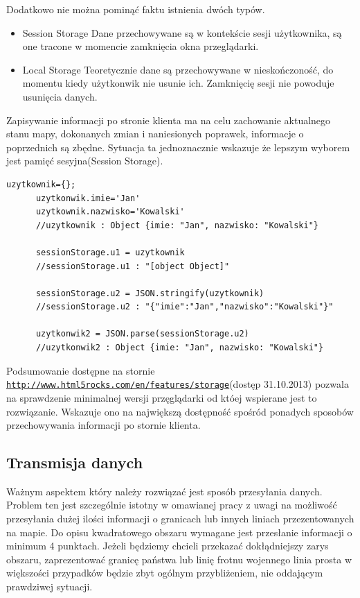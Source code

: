 Dodatkowo nie można pominąć faktu istnienia dwóch typów.
\begin{itemize}

\item
Session Storage
Dane przechowywane są w kontekście sesji użytkownika, są one tracone w momencie zamknięcia okna przeglądarki.

\item
Local Storage
Teoretycznie dane są przechowywane w nieskończoność, do momentu kiedy użytkonwik nie usunie ich. Zamknięcię sesji nie powoduje usunięcia danych.

\end{itemize}

Zapisywanie informacji po stronie klienta ma na celu zachowanie aktualnego stanu mapy, dokonanych zmian i naniesionych poprawek, informacje o poprzednich są zbędne. Sytuacja ta jednoznacznie wskazuje że lepszym wyborem jest pamięć sesyjna(Session Storage).

\lstset{language=JavaScript}
\label{lis:storage}
\begin{lstlisting}[caption=json]
      uzytkownik={};
      uzytkonwik.imie='Jan'
      uzytkownik.nazwisko='Kowalski'
      //uzytkownik : Object {imie: "Jan", nazwisko: "Kowalski"}

      sessionStorage.u1 = uzytkownik
      //sessionStorage.u1 : "[object Object]"

      sessionStorage.u2 = JSON.stringify(uzytkownik)
      //sessionStorage.u2 : "{"imie":"Jan","nazwisko":"Kowalski"}"

      uzytkonwik2 = JSON.parse(sessionStorage.u2)
      //uzytkonwik2 : Object {imie: "Jan", nazwisko: "Kowalski"}
\end{lstlisting}


Podsumowanie dostępne na stornie \underline{\texttt{http://www.html5rocks.com/en/features/storage}}(dostęp 31.10.2013) pozwala na sprawdzenie minimalnej wersji przęglądarki od któej wspierane jest to rozwiązanie. Wskazuje ono na największą dostępność spośród ponadych sposobów przechowywania informacji po stornie klienta. 

\subsection{Transmisja danych}
\label{subsec:transmisjaDanych}

Ważnym aspektem który należy rozwiązać jest sposób przesyłania danych. Problem ten jest szczególnie istotny w omawianej pracy z uwagi na możliwość przesyłania dużej ilości informacji o granicach lub innych liniach przezentowanych na mapie. Do opisu kwadratowego obszaru wymagane jest przesłanie informacji o minimum 4 punktach. Jeżeli będziemy chcieli przekazać dokłądniejszy zarys obszaru, zaprezentować granicę państwa lub linię frotnu wojennego linia prosta w większości przypadków będzie zbyt ogólnym przybliżeniem, nie oddającym prawdziwej sytuacji.

